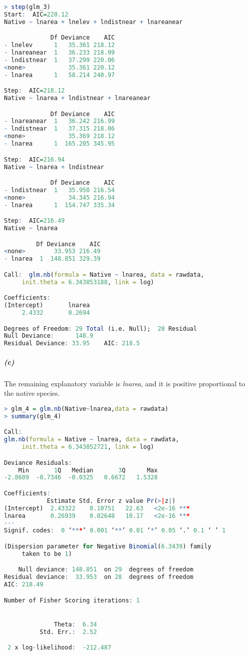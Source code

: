 \documentclass[12pt,a4paper]{article}
\begin{document}
\begin{lstlisting}[language =R]
> step(glm_3)
Start:  AIC=220.12
Native ~ lnarea + lnelev + lndistnear + lnareanear

             Df Deviance    AIC
- lnelev      1   35.361 218.12
- lnareanear  1   36.233 218.99
- lndistnear  1   37.299 220.06
<none>            35.361 220.12
- lnarea      1   58.214 240.97

Step:  AIC=218.12
Native ~ lnarea + lndistnear + lnareanear

             Df Deviance    AIC
- lnareanear  1   36.242 216.99
- lndistnear  1   37.315 218.06
<none>            35.369 218.12
- lnarea      1  165.205 345.95

Step:  AIC=216.94
Native ~ lnarea + lndistnear

             Df Deviance    AIC
- lndistnear  1   35.950 216.54
<none>            34.345 216.94
- lnarea      1  154.747 335.34

Step:  AIC=216.49
Native ~ lnarea

         Df Deviance    AIC
<none>        33.953 216.49
- lnarea  1  148.851 329.39

Call:  glm.nb(formula = Native ~ lnarea, data = rawdata, 
     init.theta = 6.343853188, link = log)

Coefficients:
(Intercept)       lnarea  
     2.4332       0.2694  

Degrees of Freedom: 29 Total (i.e. Null);  28 Residual
Null Deviance:	    148.9 
Residual Deviance: 33.95 	AIC: 218.5
\end{lstlisting}
\subparagraph{(c)}
The remaining explanatory variable is \emph{lnarea}, and it is positive proportional to the native species.
\begin{lstlisting}[language =R]
> glm_4 = glm.nb(Native~lnarea,data = rawdata) 
> summary(glm_4) 

Call:
glm.nb(formula = Native ~ lnarea, data = rawdata, 
     init.theta = 6.343852721, link = log)

Deviance Residuals: 
    Min       1Q   Median       3Q      Max  
-2.8609  -0.7346  -0.0325   0.6672   1.5328  

Coefficients:
            Estimate Std. Error z value Pr(>|z|)    
(Intercept)  2.43322    0.10751   22.63   <2e-16 ***
lnarea       0.26939    0.02648   10.17   <2e-16 ***
---
Signif. codes:  0 ‘***’ 0.001 ‘**’ 0.01 ‘*’ 0.05 ‘.’ 0.1 ‘ ’ 1

(Dispersion parameter for Negative Binomial(6.3439) family 
     taken to be 1)

    Null deviance: 148.851  on 29  degrees of freedom
Residual deviance:  33.953  on 28  degrees of freedom
AIC: 218.49

Number of Fisher Scoring iterations: 1


              Theta:  6.34 
          Std. Err.:  2.52 

 2 x log-likelihood:  -212.487 
\end{lstlisting}
\end{document}
